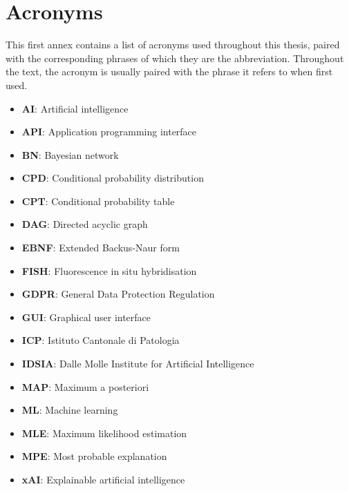\chapter{Acronyms}
This first annex contains a list of acronyms used throughout this thesis, paired with the corresponding phrases of which they are the abbreviation.
Throughout the text, the acronym is usually paired with the phrase it refers to when first used.

\begin{itemize}
  \item \textbf{AI}: Artificial intelligence
  \item \textbf{API}: Application programming interface
  \item \textbf{BN}: Bayesian network
  \item \textbf{CPD}: Conditional probability distribution
  \item \textbf{CPT}: Conditional probability table
  \item \textbf{DAG}: Directed acyclic graph
  \item \textbf{EBNF}: Extended Backus-Naur form
  \item \textbf{FISH}: Fluorescence in situ hybridisation
  \item \textbf{GDPR}: General Data Protection Regulation
  \item \textbf{GUI}: Graphical user interface
  \item \textbf{ICP}: Istituto Cantonale di Patologia
  \item \textbf{IDSIA}: Dalle Molle Institute for Artificial Intelligence
  \item \textbf{MAP}: Maximum a posteriori
  \item \textbf{ML}: Machine learning
  \item \textbf{MLE}: Maximum likelihood estimation
  \item \textbf{MPE}: Most probable explanation
  \item \textbf{xAI}: Explainable artificial intelligence
\end{itemize}